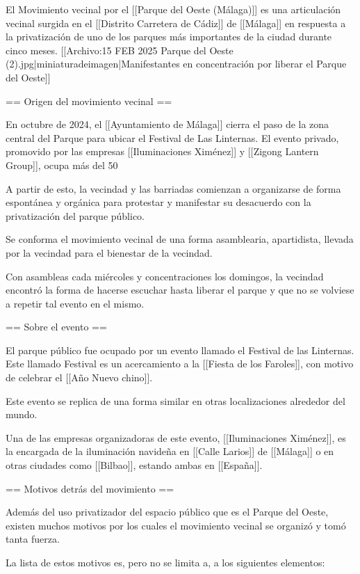 El Movimiento vecinal por el [[Parque del Oeste (Málaga)]] es una articulación vecinal surgida en el [[Distrito Carretera de Cádiz]] de [[Málaga]] en respuesta a la privatización de uno de los parques más importantes de la ciudad durante cinco meses.
[[Archivo:15 FEB 2025 Parque del Oeste (2).jpg|miniaturadeimagen|Manifestantes en concentración por liberar el Parque del Oeste]]

== Origen del movimiento vecinal ==

En octubre de 2024, el [[Ayuntamiento de Málaga]] cierra el paso de la zona central del Parque para ubicar el Festival de Las Linternas. El evento privado, promovido por las empresas [[Iluminaciones Ximénez]] y [[Zigong Lantern Group]], ocupa más del 50%

A partir de esto, la vecindad y las barriadas comienzan a organizarse de forma espontánea y orgánica para protestar y manifestar su desacuerdo con la privatización del parque público.

Se conforma el movimiento vecinal de una forma asamblearia, apartidista, llevada por la vecindad para el bienestar de la vecindad.

Con asambleas cada miércoles y concentraciones los domingos, la vecindad encontró la forma de hacerse escuchar hasta liberar el parque y que no se volviese a repetir tal evento en el mismo.

== Sobre el evento ==

El parque público fue ocupado por un evento llamado el Festival de las Linternas. Este llamado Festival es un acercamiento a la [[Fiesta de los Faroles]], con motivo de celebrar el [[Año Nuevo chino]]. 

Este evento se replica de una forma similar en otras localizaciones alrededor del mundo.

Una de las empresas organizadoras de este evento, [[Iluminaciones Ximénez]], es la encargada de la iluminación navideña en [[Calle Larios]] de [[Málaga]] o en otras ciudades como [[Bilbao]], estando ambas en [[España]].

== Motivos detrás del movimiento ==

Además del uso privatizador del espacio público que es el Parque del Oeste, existen muchos motivos por los cuales el movimiento vecinal se organizó y tomó tanta fuerza.

La lista de estos motivos es, pero no se limita a, a los siguientes elementos:

